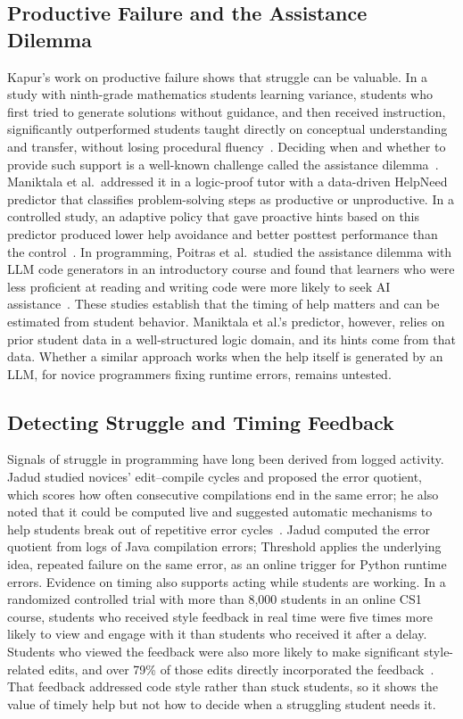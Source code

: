 \documentclass[manuscript,review]{acmart}
\begin{document}
\subsection{Productive Failure and the Assistance Dilemma}
Kapur's work on productive failure shows that struggle can be valuable. In a study with ninth-grade mathematics students learning variance, students who first tried to generate solutions without guidance, and then received instruction, significantly outperformed students taught directly on conceptual understanding and transfer, without losing procedural fluency~\cite{kapur2012variance}. Deciding when and whether to provide such support is a well-known challenge called the assistance dilemma~\cite{maniktala2020helpneed}. Maniktala et al.\ addressed it in a logic-proof tutor with a data-driven HelpNeed predictor that classifies problem-solving steps as productive or unproductive. In a controlled study, an adaptive policy that gave proactive hints based on this predictor produced lower help avoidance and better posttest performance than the control~\cite{maniktala2020helpneed}. In programming, Poitras et al.\ studied the assistance dilemma with LLM code generators in an introductory course and found that learners who were less proficient at reading and writing code were more likely to seek AI assistance~\cite{poitras2024assistance}. These studies establish that the timing of help matters and can be estimated from student behavior. Maniktala et al.'s predictor, however, relies on prior student data in a well-structured logic domain, and its hints come from that data. Whether a similar approach works when the help itself is generated by an LLM, for novice programmers fixing runtime errors, remains untested.

\subsection{Detecting Struggle and Timing Feedback}
Signals of struggle in programming have long been derived from logged activity. Jadud studied novices' edit--compile cycles and proposed the error quotient, which scores how often consecutive compilations end in the same error; he also noted that it could be computed live and suggested automatic mechanisms to help students break out of repetitive error cycles~\cite{jadud2006methods}. Jadud computed the error quotient from logs of Java compilation errors; Threshold applies the underlying idea, repeated failure on the same error, as an online trigger for Python runtime errors. Evidence on timing also supports acting while students are working. In a randomized controlled trial with more than 8,000 students in an online CS1 course, students who received style feedback in real time were five times more likely to view and engage with it than students who received it after a delay. Students who viewed the feedback were also more likely to make significant style-related edits, and over 79\% of those edits directly incorporated the feedback~\cite{woodrow2024style}. That feedback addressed code style rather than stuck students, so it shows the value of timely help but not how to decide when a struggling student needs it.
\end{document}

